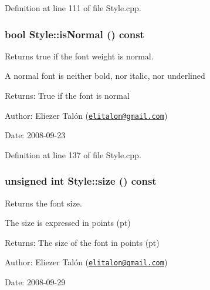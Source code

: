 Definition at line 111 of file Style.cpp.\hypertarget{class_style_db2cbc7ca50b2f5c632c8e9b0420044c}{
\subsubsection[isNormal]{\setlength{\rightskip}{0pt plus 5cm}bool Style::isNormal () const}}
\label{class_style_db2cbc7ca50b2f5c632c8e9b0420044c}


Returns true if the font weight is normal. 

A normal font is neither bold, nor italic, nor underlined

\begin{Desc}
\item[Returns:]True if the font is normal\end{Desc}
\begin{Desc}
\item[Author:]Eliezer Talón (\href{mailto:elitalon@gmail.com}{\tt elitalon@gmail.com}) \end{Desc}
\begin{Desc}
\item[Date:]2008-09-23 \end{Desc}


Definition at line 137 of file Style.cpp.\hypertarget{class_style_73cb356fdfc022f51ff263b1c1faa9fd}{
\subsubsection[size]{\setlength{\rightskip}{0pt plus 5cm}unsigned int Style::size () const}}
\label{class_style_73cb356fdfc022f51ff263b1c1faa9fd}


Returns the font size. 

The size is expressed in points (pt)

\begin{Desc}
\item[Returns:]The size of the font in points (pt)\end{Desc}
\begin{Desc}
\item[Author:]Eliezer Talón (\href{mailto:elitalon@gmail.com}{\tt elitalon@gmail.com}) \end{Desc}
\begin{Desc}
\item[Date:]2008-09-29 \end{Desc}


